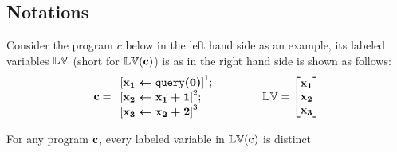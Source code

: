 \subsection{Notations}
%
\label{subsec:alg_notation}
%
Consider the program $c$ below in the left hand side as an example, its labeled variables $\mathbb{LV}$ (short for $\mathbb{LV}({\boldsymbol{\mathbf{c}}})$) is as in the right hand side is shown as follows:
$$
\ssa{c} = 
\begin{array}{l}
\left[\ssa{\assign {x_1} {\query(0)}}		\right]^1;
\\
\left[\ssa{\assign {x_2} {x_1 + 1}}		\right]^2;
\\
\left[\ssa{\assign {x_3} {x_2 + 2}}		\right]^3
\end{array}
~~~~~~~~~~~~
\lvar = \left [ 
\begin{matrix}
\ssa{x_1} \\
\ssa{x_2} \\
\ssa{x_3} \\
\end{matrix} \right ]
$$
%
\begin{lem}
For any program ${\boldsymbol{\mathbf{c}}}$, every labeled variable in $\mathbb{LV}({\boldsymbol{\mathbf{c}}})$ is distinct
\end{lem}
%
